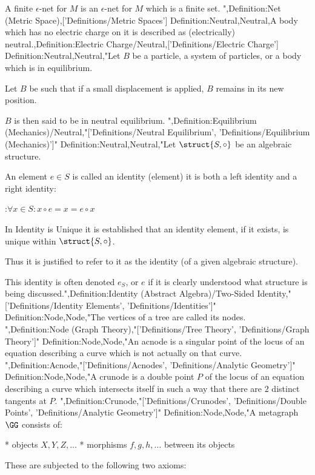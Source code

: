 A finite $\epsilon$-net for $M$ is an $\epsilon$-net for $M$ which is a finite set.
",Definition:Net (Metric Space),['Definitions/Metric Spaces']
Definition:Neutral,Neutral,A body which has no electric charge on it is described as (electrically) neutral.,Definition:Electric Charge/Neutral,['Definitions/Electric Charge']
Definition:Neutral,Neutral,"Let $B$ be a particle, a system of particles, or a body which is in equilibrium.

Let $B$ be such that if a small displacement is applied, $B$ remains in its new position.


$B$ is then said to be in neutral equilibrium.
",Definition:Equilibrium (Mechanics)/Neutral,"['Definitions/Neutral Equilibrium', 'Definitions/Equilibrium (Mechanics)']"
Definition:Neutral,Neutral,"Let $\struct {S, \circ}$ be an algebraic structure.

An element $e \in S$ is called an identity (element)  it is both a left identity and a right identity:

:$\forall x \in S: x \circ e = x = e \circ x$


In Identity is Unique it is established that an identity element, if it exists, is unique within $\struct {S, \circ}$.

Thus it is justified to refer to it as the identity (of a given algebraic structure).


This identity is often denoted $e_S$, or $e$ if it is clearly understood what structure is being discussed.",Definition:Identity (Abstract Algebra)/Two-Sided Identity,"['Definitions/Identity Elements', 'Definitions/Identities']"
Definition:Node,Node,"The vertices of a tree are called its nodes.
",Definition:Node (Graph Theory),"['Definitions/Tree Theory', 'Definitions/Graph Theory']"
Definition:Node,Node,"An acnode is a singular point of the locus of an equation describing a curve which is not actually on that curve.
",Definition:Acnode,"['Definitions/Acnodes', 'Definitions/Analytic Geometry']"
Definition:Node,Node,"A crunode is a double point $P$ of the locus of an equation describing a curve which intersects itself in such a way that there are $2$ distinct tangents at $P$.
",Definition:Crunode,"['Definitions/Crunodes', 'Definitions/Double Points', 'Definitions/Analytic Geometry']"
Definition:Node,Node,"A metagraph $\GG$ consists of:

* objects $X, Y, Z, \ldots$
* morphisms $f, g, h, \ldots$ between its objects

These are subjected to the following two axioms:







